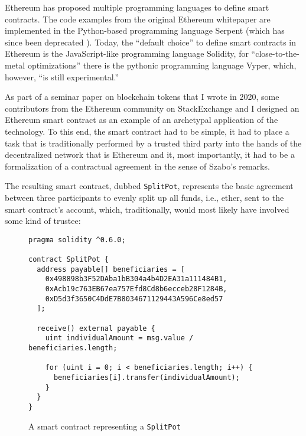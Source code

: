 Ethereum has proposed multiple programming languages to define smart contracts.
The code examples from the original Ethereum whitepaper are implemented in the Python-based programming language Serpent (which has since been deprecated \autocite{twitter2017serpentdeprecation}).
Today, the ``default choice'' to define smart contracts in Ethereum is the JavaScript-like programming language Solidity, for ``close-to-the-metal optimizations'' there is the pythonic programming language Vyper, which, however, ``is still experimental.'' \autocite{github2017serpentreadme}

As part of a seminar paper on blockchain tokens \autocite{github2020blockchaintokens} that I wrote in 2020, some contributors from the Ethereum community on StackExchange \autocite{stackexchange2020ethereumsmartcontract} and I designed an Ethereum smart contract as an example of an archetypal application of the technology.
To this end, the smart contract had to be simple, it had to place a task that is traditionally performed by a trusted third party into the hands of the decentralized network that is Ethereum and it, most importantly, it had to be a formalization of a contractual agreement in the sense of Szabo's remarks.

The resulting smart contract, dubbed \texttt{SplitPot}, represents the basic agreement between three participants to evenly split up all funds, i.e., ether, sent to the smart contract's account, which, traditionally, would most likely have involved some kind of trustee:
\\
\begin{figure}[H]
\begin{lstlisting}
pragma solidity ^0.6.0;

contract SplitPot {
  address payable[] beneficiaries = [
    0x498898b3F52DAba1bB304a4b4D2EA31a111484B1,
    0xAcb19c763EB67ea757Efd8Cd8b6ecceb28F1284B,
    0xD5d3f3650C4DdE7B8034671129443A596Ce8ed57
  ];

  receive() external payable {
    uint individualAmount = msg.value / beneficiaries.length;
    
    for (uint i = 0; i < beneficiaries.length; i++) {
      beneficiaries[i].transfer(individualAmount);
    }
  }
}
\end{lstlisting}
\caption*{A smart contract representing a \texttt{SplitPot}}
\end{figure}

